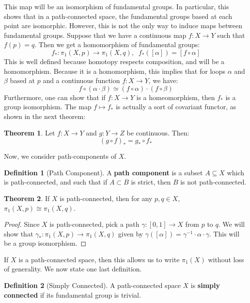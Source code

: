 \documentclass[11pt, oneside]{amsart}   	%
\theoremstyle{definition}
\newtheorem{definition}{Definition}[section]
\newtheorem{theorem}{Theorem}[section]
\begin{document}
	This map will be an isomorphism of fundamental groups. In particular, this shows that in a path-connected space, the fundamental groups based at each point 
	are isomorphic. However, this is not the only way to induce maps between fundamental groups. Suppose that we have a continuous map $f : X\rightarrow Y$ 
	such that $f(p) = q$. Then we get a homomorphism of fundamental groups:
	$$
		f_* : \pi_1(X, p)\rightarrow\pi_1(X, q), \;\; f_*([\alpha]) = [f\circ\alpha]
	$$
	This is well defined because homotopy respects composition, and will be a homomorphism. Because it is a homomorphism, this implies that for loops $\alpha$ 
	and $\beta$ based at $p$ and a continuous function $f : X\rightarrow Y$, we have:
	$$
		f\circ (\alpha\cdot\beta)\simeq (f\circ\alpha)\cdot (f\circ\beta)
	$$
	Furthermore, one can show that if $f : X\rightarrow Y$ is a homeomorphism, then $f_*$ is a group isomorphism. The map $f\mapsto f_*$ is actually a sort of 
	covariant functor, as shown in the next theorem:
	
	\begin{theorem}
		Let $f : X\rightarrow Y$ and $g : Y\rightarrow Z$ be continuous. Then:
		$$
			(g\circ f)_* = g_*\circ f_*
		$$
	\end{theorem}
	
	Now, we consider path-components of $X$.
	
	\begin{definition}[Path Component]
		A \textbf{path component} is a subset $A\subseteq X$ which is path-connected, and such that if $A\subset B$ is strict, then $B$ is not path-connected.
	\end{definition}
	
	\begin{theorem}
		If $X$ is path-connected, then for any $p, q\in X$, $\pi_1(X, p)\cong\pi_1(X, q)$. 
	\end{theorem}
	
	\begin{proof}
		Since $X$ is path-connected, pick a path $\gamma : [0, 1]\rightarrow X$ from $p$ to $q$. We will show that $\gamma_* : \pi_1(X, p)\rightarrow\pi_1(X, 
		q)$ given by $\gamma([\alpha]) = \gamma^{-1}\cdot\alpha\cdot\gamma$. This will be a group isomorphism.
	\end{proof}
	
	If $X$ is a path-connected space, then this allows us to write $\pi_1(X)$ without loss of generality. We now state one last definition.
	
	\begin{definition}[Simply Connected]
		A path-connected space $X$ is \textbf{simply connected} if its fundamental group is trivial.
	\end{definition}
\end{document}
